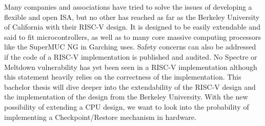 Many companies and associations have tried to solve the issues of developing a flexible and open ISA, 
but no other has reached as far as the Berkeley University of California with their RISC-V design.
It is designed to be easily extendable and said to fit microcontrollers, as well as to many core
massive computing processors like the SuperMUC NG in Garching uses.
Safety concerns can also be addressed if the code of a RISC-V implementation is published
and audited. No Spectre or Meltdown vulnerability has yet been seen in a RISC-V implementation
although this statement heavily relies on the correctness of the implementation.
This bachelor thesis will dive deeper into the extendability of the RISC-V design and the
implementation of the design from the Berkeley University.
With the new possibility of extending a CPU design, we want to look into the probability
of implementing a Checkpoint/Restore mechanism in hardware.